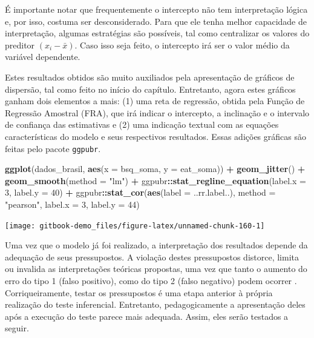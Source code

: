 \documentclass[
]{book}
\newenvironment{Shaded}{\begin{snugshade}}{\end{snugshade}}
\newcommand{\DataTypeTok}[1]{\textcolor[rgb]{0.13,0.29,0.53}{#1}}
\newcommand{\DecValTok}[1]{\textcolor[rgb]{0.00,0.00,0.81}{#1}}
\newcommand{\KeywordTok}[1]{\textcolor[rgb]{0.13,0.29,0.53}{\textbf{#1}}}
\newcommand{\NormalTok}[1]{#1}
\newcommand{\OperatorTok}[1]{\textcolor[rgb]{0.81,0.36,0.00}{\textbf{#1}}}
\newcommand{\StringTok}[1]{\textcolor[rgb]{0.31,0.60,0.02}{#1}}
\begin{document}
É importante notar que frequentemente o intercepto não tem interpretação lógica e, por isso, costuma ser desconsiderado. Para que ele tenha melhor capacidade de interpretação, algumas estratégias são possíveis, tal como centralizar os valores do preditor \((x_i-\bar{x})\). Caso isso seja feito, o intercepto irá ser o valor médio da variável dependente.

Estes resultados obtidos são muito auxiliados pela apresentação de gráficos de dispersão, tal como feito no início do capítulo. Entretanto, agora estes gráficos ganham dois elementos a mais: (1) uma reta de regressão, obtida pela Função de Regressão Amostral (FRA), que irá indicar o intercepto, a inclinação e o intervalo de confiança das estimativas e (2) uma indicação textual com as equações características do modelo e seus respectivos resultados. Essas adições gráficas são feitas pelo pacote \texttt{ggpubr}.

\begin{Shaded}
\begin{Highlighting}[]
\KeywordTok{ggplot}\NormalTok{(dados_brasil, }\KeywordTok{aes}\NormalTok{(}\DataTypeTok{x =}\NormalTok{ bsq_soma, }\DataTypeTok{y =}\NormalTok{ eat_soma)) }\OperatorTok{+}
\StringTok{  }\KeywordTok{geom_jitter}\NormalTok{() }\OperatorTok{+}\StringTok{ }\KeywordTok{geom_smooth}\NormalTok{(}\DataTypeTok{method =} \StringTok{"lm"}\NormalTok{) }\OperatorTok{+}\StringTok{ }
\StringTok{  }\NormalTok{ggpubr}\OperatorTok{::}\KeywordTok{stat_regline_equation}\NormalTok{(}\DataTypeTok{label.x =} \DecValTok{3}\NormalTok{, }\DataTypeTok{label.y =} \DecValTok{40}\NormalTok{) }\OperatorTok{+}
\StringTok{  }\NormalTok{ggpubr}\OperatorTok{::}\KeywordTok{stat_cor}\NormalTok{(}\KeywordTok{aes}\NormalTok{(}\DataTypeTok{label =}\NormalTok{  ..rr.label..), }\DataTypeTok{method =} \StringTok{"pearson"}\NormalTok{, }
                   \DataTypeTok{label.x =} \DecValTok{3}\NormalTok{, }\DataTypeTok{label.y =} \DecValTok{44}\NormalTok{)}
\end{Highlighting}
\end{Shaded}

\begin{center}\texttt{[image: gitbook-demo\_files/figure-latex/unnamed-chunk-160-1]} \end{center}

Uma vez que o modelo já foi realizado, a interpretação dos resultados depende da adequação de seus pressupostos. A violação destes pressupostos distorce, limita ou invalida as interpretações teóricas propostas, uma vez que tanto o aumento do erro do tipo 1 (falso positivo), como do tipo 2 (falso negativo) podem ocorrer \citep{Lix1996, Barker2015, Ernst2017}. Corriqueiramente, testar os pressupostos é uma etapa anterior à própria realização do teste inferencial. Entretanto, pedagogicamente a apresentação deles após a execução do teste parece mais adequada. Assim, eles serão testados a seguir.
\end{document}
